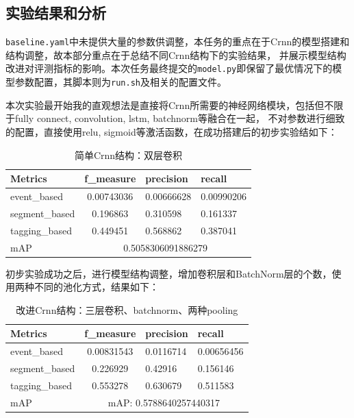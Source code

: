 \documentclass[]{ctexart}
\begin{document}
\subsection{实验结果和分析}
\texttt{baseline.yaml}中未提供大量的参数供调整，本任务的重点在于Crnn的模型搭建和结构调整，故本部分重点在于总结不同Crnn结构下的实验结果，
并展示模型结构改进对评测指标的影响。本次任务最终提交的\texttt{model.py}即保留了最优情况下的模型参数配置，其脚本则为\texttt{run.sh}及相关的配置文件。

本次实验最开始我的直观想法是直接将Crnn所需要的神经网络模块，包括但不限于fully connect, convolution, lstm, batchnorm等融合在一起，
不对参数进行细致的配置，直接使用relu, sigmoid等激活函数，在成功搭建后的初步实验结如下：
\begin{table}[ht]
    \centering
    \begin{tabular}{|l|cll|}
    \hline
    Metrics        & \multicolumn{1}{c|}{f\_measure} & \multicolumn{1}{l|}{precision}  & recall     \\ \hline
    event\_based   & \multicolumn{1}{c|}{0.00743036} & \multicolumn{1}{l|}{0.00666628} & 0.00990206 \\ \hline
    segment\_based & \multicolumn{1}{c|}{0.196863}   & \multicolumn{1}{l|}{0.310598}   & 0.161337   \\ \hline
    tagging\_based & \multicolumn{1}{c|}{0.449451}   & \multicolumn{1}{l|}{0.568862}   & 0.387041   \\ \hline
    mAP            & \multicolumn{3}{c|}{0.5058306091886279}                                        \\ \hline
    \end{tabular}
    \caption{简单Crnn结构：双层卷积}
    \label{exp1}
\end{table}

初步实验成功之后，进行模型结构调整，增加卷积层和BatchNorm层的个数，使用两种不同的池化方式，结果如下：
\begin{table}[ht]
    \centering
    \begin{tabular}{|l|cll|}
    \hline
    Metrics        & \multicolumn{1}{c|}{f\_measure} & \multicolumn{1}{l|}{precision}  & recall     \\ \hline
    event\_based   & \multicolumn{1}{c|}{0.00831543} & \multicolumn{1}{l|}{0.0116714}  & 0.00656456 \\ \hline
    segment\_based & \multicolumn{1}{c|}{0.226929}   & \multicolumn{1}{l|}{0.42916}    & 0.156146   \\ \hline
    tagging\_based & \multicolumn{1}{c|}{0.553278}   & \multicolumn{1}{l|}{0.630679}   & 0.511583   \\ \hline
    mAP            & \multicolumn{3}{c|}{mAP: 0.5788640257440317}                                        \\ \hline
    \end{tabular}
    \caption{改进Crnn结构：三层卷积、batchnorm、两种pooling}
    \label{exp2}
\end{table}
\end{document}

